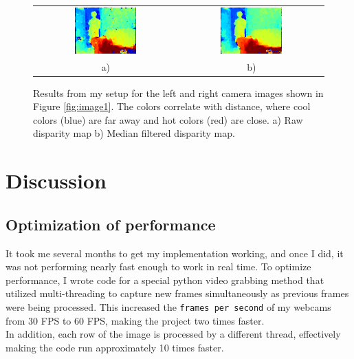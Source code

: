 \documentclass[11pt,fleqn]{article}
\begin{document}
\begin{figure}[!h]
\begin{mdframed}
\centering
\setlength{}
\begin{tabular}{cc}
\includegraphics[width=0.45\textwidth]{images/res.png} &
\includegraphics[width=0.45\textwidth]{images/nomedres.png} \\[2pt]
a) & b) \\
\end{tabular}
\caption[Results from my setup]{Results from my setup for the left and right camera images shown in Figure \ref{fig:image1}. The colors correlate with distance, where cool colors (blue) are far away and hot colors (red) are close. a) Raw disparity map b) Median filtered disparity map.}
\label{fig:image2}
\end{mdframed}
\end{figure}

\section{Discussion}

\subsection{Optimization of performance}

It took me several months to get my implementation working, and once I did, it was not performing nearly fast enough to work in real time. To optimize performance, I wrote code for a special python video grabbing method that utilized multi-threading to capture new frames simultaneously as previous frames were being processed. This increased the \texttt{frames per second} of my webcams from 30 FPS to 60 FPS, making the project two times faster.\\[5pt]
%
In addition, each row of the image is processed by a different thread, effectively making the code run approximately 10 times faster.
\end{document}
